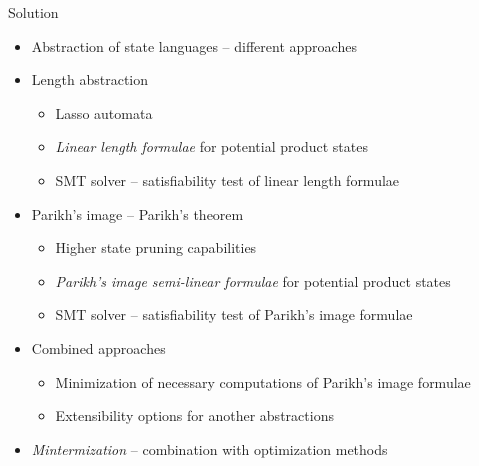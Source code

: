 \begin{frame}{Solution}
    \begin{itemize}
        \item Abstraction of state languages -- different approaches
        \item Length abstraction
        \begin{itemize}
            \item Lasso automata
            \item \emph{Linear length formulae} for potential product states
            \item SMT solver -- satisfiability test of linear length formulae
        \end{itemize}
        \item Parikh's image -- Parikh's theorem
        \begin{itemize}
            \item Higher state pruning capabilities
            \item \emph{Parikh's image semi-linear formulae} for potential product states
            \item SMT solver -- satisfiability test of Parikh's image formulae
        \end{itemize}
        \item Combined approaches
        \begin{itemize}
            \item Minimization of necessary computations of Parikh's image formulae
            \item Extensibility options for another abstractions
        \end{itemize}
        \item \emph{Mintermization} -- combination with optimization methods
    \end{itemize}
\end{frame}


